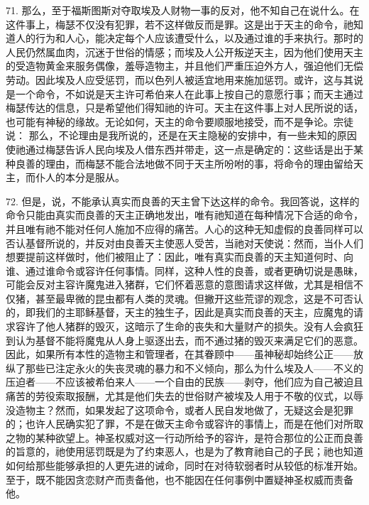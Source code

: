 71. 那么，至于福斯图斯对夺取埃及人财物一事的反对，他不知自己在说什么。在这件事上，梅瑟不仅没有犯罪，若不这样做反而是罪。这是出于天主的命令，祂知道人的行为和人心，能决定每个人应该遭受什么，以及通过谁的手来执行。那时的人民仍然属血肉，沉迷于世俗的情感；而埃及人公开叛逆天主，因为他们使用天主的受造物黄金来服务偶像，羞辱造物主，并且他们严重压迫外方人，强迫他们无偿劳动。因此埃及人应受惩罚，而以色列人被适宜地用来施加惩罚。或许，这与其说是一个命令，不如说是天主许可希伯来人在此事上按自己的意愿行事；而天主通过梅瑟传达的信息，只是希望他们得知祂的许可。天主在这件事上对人民所说的话，也可能有神秘的缘故。无论如何，天主的命令要顺服地接受，而不是争论。宗徒说： 那么，不论理由是我所说的，还是在天主隐秘的安排中，有一些未知的原因使祂通过梅瑟告诉人民向埃及人借东西并带走，这一点是确定的：这些话是出于某种良善的理由，而梅瑟不能合法地做不同于天主所吩咐的事，将命令的理由留给天主，而仆人的本分是服从。\par

72. 但是，说，不能承认真实而良善的天主曾下达这样的命令。我回答说，这样的命令只能由真实而良善的天主正确地发出，唯有祂知道在每种情况下合适的命令，并且唯有祂不能对任何人施加不应得的痛苦。人心的这种无知虚假的良善同样可以否认基督所说的，并反对由良善天主使恶人受苦，当祂对天使说：然而，当仆人们想要提前这样做时，他们被阻止了：因此，唯有真实而良善的天主知道何时、向谁、通过谁命令或容许任何事情。同样，这种人性的良善，或者更确切说是愚昧，可能会反对主容许魔鬼进入猪群，它们怀着恶意的意图请求这样做，尤其是相信不仅猪，甚至最卑微的昆虫都有人类的灵魂。但撇开这些荒谬的观念，这是不可否认的，即我们的主耶稣基督，天主的独生子，因此是真实而良善的天主，应魔鬼的请求容许了他人猪群的毁灭，这暗示了生命的丧失和大量财产的损失。没有人会疯狂到认为基督不能将魔鬼从人身上驱逐出去，而不通过猪的毁灭来满足它们的恶意。因此，如果所有本性的造物主和管理者，在其眷顾中——虽神秘却始终公正——放纵了那些已注定永火的失丧灵魂的暴力和不义倾向，那么为什么埃及人——不义的压迫者——不应该被希伯来人——一个自由的民族——剥夺，他们应为自己被迫且痛苦的劳役索取报酬，尤其是他们失去的世俗财产被埃及人用于不敬的仪式，以辱没造物主？然而，如果发起了这项命令，或者人民自发地做了，无疑这会是犯罪的；也许人民确实犯了罪，不是在做天主命令或容许的事情上，而是在他们对所取之物的某种欲望上。神圣权威对这一行动所给予的容许，是符合那位的公正而良善的旨意的，祂使用惩罚既是为了约束恶人，也是为了教育祂自己的子民；祂也知道如何给那些能够承担的人更先进的诫命，同时在对待软弱者时从较低的标准开始。至于，既不能因贪恋财产而责备他，也不能因在任何事例中置疑神圣权威而责备他。\par


